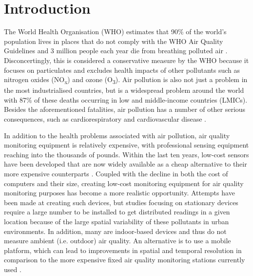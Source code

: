 \documentclass[11pt,twosided,a4paper]{report}
\begin{document}
\chapter{Introduction}

The World Health Organisation (WHO) estimates that 90\% of the world's population lives in places that do not comply with the WHO Air Quality Guidelines and 3 million people each year die from breathing polluted air \citep{WHO2016ambient}. Disconcertingly, this is considered a conservative measure by the WHO because it focuses on particulates and excludes health impacts of other pollutants such as nitrogen oxides (NO\textsubscript{x}) and ozone (O\textsubscript{3}). Air pollution is also not just a problem in the most industrialised countries, but is a widespread problem around the world with 87\% of these deaths occurring in low and middle-income countries (LMICs). Besides the aforementioned fatalities, air pollution has a number of other serious consequences, such as cardiorespiratory and cardiovascular disease \citep{pope1995particulate,dockery1993_6cityairpoll,pope2002lungcancercardiomortality}.


In addition to the health problems associated with air pollution, air quality monitoring equipment is relatively expensive, with professional sensing equipment reaching into the thousands of pounds. Within the last ten years, low-cost sensors have been developed that are now widely available as a cheap alternative to their more expensive counterparts \citep{Clements2017lowcostworkshop}. Coupled with the decline in both the cost of computers and their size, creating low-cost monitoring equipment for air quality monitoring purposes has become a more realistic opportunity. Attempts have been made at creating such devices, but studies focusing on stationary devices require a large number to be installed to get distributed readings in a given location because of the large spatial variability of these pollutants in urban environments. In addition, many are indoor-based devices and thus do not measure ambient (i.e. outdoor) air quality. An alternative is to use a mobile platform, which can lead to improvements in spatial and temporal resolution in comparison to the more expensive fixed air quality monitoring stations currently used \citep{Weijers2004movingmeasurementunit,Westerdahl2005losangeles,Wallace2009mobilehamilton,Hagler2010durhamallelectric,Adams2012hamilton20052010,Elen2013aeroflex}. %
\end{document}
